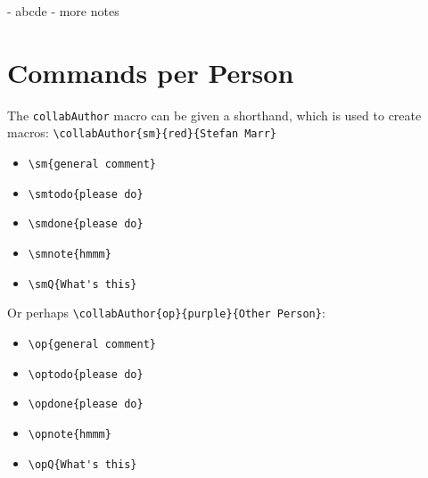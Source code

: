 \documentclass{article}
\begin{document}
\begin{note}
- abcde
- more notes
\end{note}



\section{Commands per Person}

The \verb|collabAuthor| macro can be given a shorthand, which is used to create macros:
\verb|\collabAuthor{sm}{red}{Stefan Marr}|

\begin{itemize}
  \item \verb|\sm{general comment}| 
  \item \verb|\smtodo{please do}| 
  \item \verb|\smdone{please do}| 
  \item \verb|\smnote{hmmm}| 
  \item \verb|\smQ{What's this}| 
\end{itemize}

Or perhaps \verb|\collabAuthor{op}{purple}{Other Person}|:

\begin{itemize}
  \item \verb|\op{general comment}| 
  \item \verb|\optodo{please do}| 
  \item \verb|\opdone{please do}| 
  \item \verb|\opnote{hmmm}| 
  \item \verb|\opQ{What's this}| 
\end{itemize}
\end{document}
